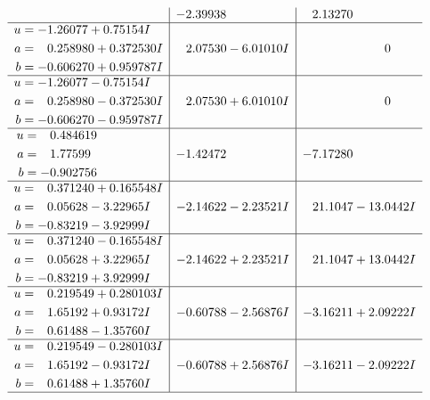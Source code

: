 \documentclass[1p]{elsarticle_modified}
\theoremstyle{definition}
\begin{document}
$$\begin{array}{c|c|c}
 & -2.39938\phantom{ +0.000000I} & \phantom{-}2.13270\phantom{ +0.000000I} \\ \hline\begin{aligned}
u &= -1.26077 + 0.75154 I \\
a &= \phantom{-}0.258980 + 0.372530 I \\
b &= -0.606270 + 0.959787 I\end{aligned}
 & \phantom{-}2.07530 - 6.01010 I & \phantom{-0.000000 } 0 \\ \hline\begin{aligned}
u &= -1.26077 - 0.75154 I \\
a &= \phantom{-}0.258980 - 0.372530 I \\
b &= -0.606270 - 0.959787 I\end{aligned}
 & \phantom{-}2.07530 + 6.01010 I & \phantom{-0.000000 } 0 \\ \hline\begin{aligned}
u &= \phantom{-}0.484619\phantom{ +0.000000I} \\
a &= \phantom{-}1.77599\phantom{ +0.000000I} \\
b &= -0.902756\phantom{ +0.000000I}\end{aligned}
 & -1.42472\phantom{ +0.000000I} & -7.17280\phantom{ +0.000000I} \\ \hline\begin{aligned}
u &= \phantom{-}0.371240 + 0.165548 I \\
a &= \phantom{-}0.05628 - 3.22965 I \\
b &= -0.83219 - 3.92999 I\end{aligned}
 & -2.14622 - 2.23521 I & \phantom{-}21.1047 - 13.0442 I \\ \hline\begin{aligned}
u &= \phantom{-}0.371240 - 0.165548 I \\
a &= \phantom{-}0.05628 + 3.22965 I \\
b &= -0.83219 + 3.92999 I\end{aligned}
 & -2.14622 + 2.23521 I & \phantom{-}21.1047 + 13.0442 I \\ \hline\begin{aligned}
u &= \phantom{-}0.219549 + 0.280103 I \\
a &= \phantom{-}1.65192 + 0.93172 I \\
b &= \phantom{-}0.61488 - 1.35760 I\end{aligned}
 & -0.60788 - 2.56876 I & -3.16211 + 2.09222 I \\ \hline\begin{aligned}
u &= \phantom{-}0.219549 - 0.280103 I \\
a &= \phantom{-}1.65192 - 0.93172 I \\
b &= \phantom{-}0.61488 + 1.35760 I\end{aligned}
 & -0.60788 + 2.56876 I & -3.16211 - 2.09222 I\\
 \hline 
 \end{array}$$\newpage\newpage\renewcommand{\arraystretch}{1}
\end{document}
